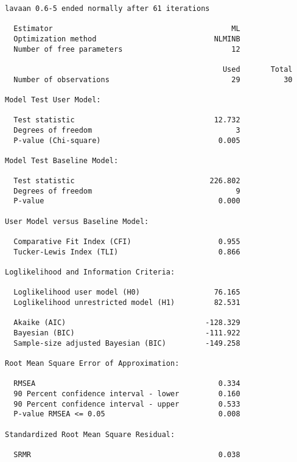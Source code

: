 \begin{verbatim}
lavaan 0.6-5 ended normally after 61 iterations

  Estimator                                         ML
  Optimization method                           NLMINB
  Number of free parameters                         12
                                                      
                                                  Used       Total
  Number of observations                            29          30
                                                                  
Model Test User Model:
                                                      
  Test statistic                                12.732
  Degrees of freedom                                 3
  P-value (Chi-square)                           0.005

Model Test Baseline Model:

  Test statistic                               226.802
  Degrees of freedom                                 9
  P-value                                        0.000

User Model versus Baseline Model:

  Comparative Fit Index (CFI)                    0.955
  Tucker-Lewis Index (TLI)                       0.866

Loglikelihood and Information Criteria:

  Loglikelihood user model (H0)                 76.165
  Loglikelihood unrestricted model (H1)         82.531
                                                      
  Akaike (AIC)                                -128.329
  Bayesian (BIC)                              -111.922
  Sample-size adjusted Bayesian (BIC)         -149.258

Root Mean Square Error of Approximation:

  RMSEA                                          0.334
  90 Percent confidence interval - lower         0.160
  90 Percent confidence interval - upper         0.533
  P-value RMSEA <= 0.05                          0.008

Standardized Root Mean Square Residual:

  SRMR                                           0.038
\end{verbatim}
